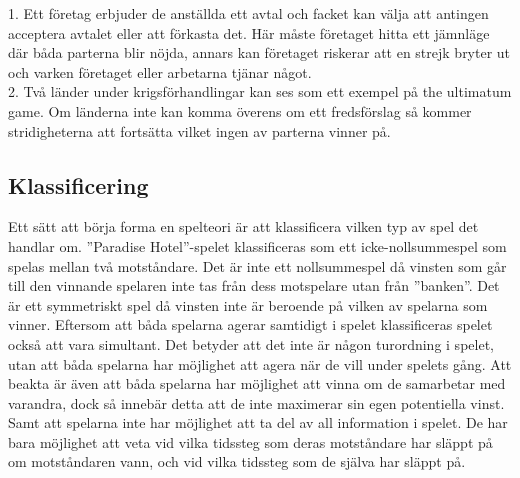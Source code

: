 1. Ett företag erbjuder de anställda ett avtal och facket kan välja att antingen acceptera avtalet eller att förkasta det. Här måste företaget hitta ett jämnläge där båda parterna blir nöjda, annars kan företaget riskerar att en strejk bryter ut och varken företaget eller arbetarna tjänar något. \\

2. Två länder under krigsförhandlingar kan ses som ett exempel på the ultimatum game. Om länderna inte kan komma överens om ett fredsförslag så kommer stridigheterna att fortsätta vilket ingen av parterna vinner på.\\



\subsection{Klassificering}
\noindent Ett sätt att börja forma en spelteori är att klassificera vilken typ av spel det handlar om. ”Paradise Hotel”-spelet klassificeras som ett icke-nollsummespel som spelas mellan två motståndare. Det är inte ett nollsummespel då vinsten som går till den vinnande spelaren inte tas från dess motspelare utan från ”banken”. Det är ett symmetriskt spel då vinsten inte är beroende på vilken av spelarna som vinner. Eftersom att båda spelarna agerar samtidigt i spelet klassificeras spelet också att vara simultant. Det betyder att det inte är någon turordning i spelet, utan att båda spelarna har möjlighet att agera när de vill under spelets gång. Att beakta är även att båda spelarna har möjlighet att vinna om de samarbetar med varandra, dock så innebär detta att de inte maximerar sin egen potentiella vinst. Samt att spelarna inte har möjlighet att ta del av all information i spelet. De har bara möjlighet att veta vid vilka tidssteg som deras motståndare har släppt på om motståndaren vann, och vid vilka tidssteg som de själva har släppt på.